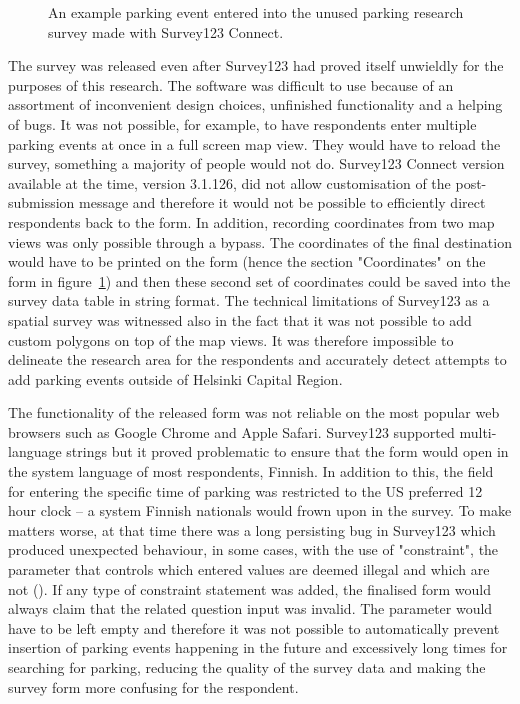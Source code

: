\begin{figure}[H]%
    \centering
    \caption[The unused parking survey created with Survey123]{An example parking event entered into the unused parking research survey made with Survey123 Connect.}%
    \label{fig:survey123}%
\end{figure}

The survey was released even after Survey123 had proved itself unwieldly for the purposes of this research. The software was difficult to use because of an assortment of inconvenient design choices, unfinished functionality and a helping of bugs. It was not possible, for example, to have respondents enter multiple parking events at once in a full screen map view. They would have to reload the survey, something a majority of people would not do. Survey123 Connect version available at the time, version 3.1.126, did not allow customisation of the post-submission message and therefore it would not be possible to efficiently direct respondents back to the form. In addition, recording coordinates from two map views was only possible through a bypass. The coordinates of the final destination would have to be printed on the form (hence the section "Coordinates" on the form in figure~\ref{fig:survey123}) and then these second set of coordinates could be saved into the survey data table in string format. The technical limitations of Survey123 as a spatial survey was witnessed also in the fact that it was not possible to add custom polygons on top of the map views. It was therefore impossible to delineate the research area for the respondents and accurately detect attempts to add parking events outside of Helsinki Capital Region.

The functionality of the released form was not reliable on the most popular web browsers such as Google Chrome and Apple Safari. Survey123 supported multi-language strings but it proved problematic to ensure that the form would open in the system language of most respondents, Finnish. In addition to this, the field for entering the specific time of parking was restricted to the US preferred 12 hour clock -- a system Finnish nationals would frown upon in the survey. To make matters worse, at that time there was a long persisting bug in Survey123 which produced unexpected behaviour, in some cases, with the use of "constraint", the parameter that controls which entered values are deemed illegal and which are not (\cite{GeoNet-TheEsriCommunity2018}). If any type of constraint statement was added, the finalised form would always claim that the related question input was invalid. The parameter would have to be left empty and therefore it was not possible to automatically prevent insertion of parking events happening in the future and excessively long times for searching for parking, reducing the quality of the survey data and making the survey form more confusing for the respondent.


